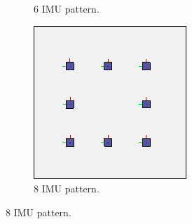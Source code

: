 \begin{figure}[h!]
\begin{subfigure}[b]{0.2\linewidth}
    \caption{6 IMU pattern.}
  \end{subfigure}
\begin{subfigure}[b]{0.2\linewidth}
    \includegraphics[width=\linewidth]{figures/IMU8.png}
    \caption{8 IMU pattern.}
  \end{subfigure}


\end{figure}
